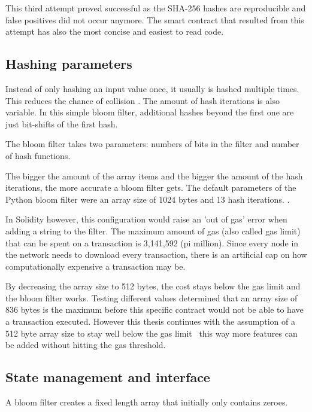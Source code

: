 This third attempt proved successful as the SHA-256 hashes are reproducible and false positives did not occur anymore. The smart contract that resulted from this attempt has also the most concise and easiest to read code.

\subsection{Hashing parameters}

Instead of only hashing an input value once, it usually is hashed multiple times. This reduces the chance of collision \cite{MultipleHashes}. The amount of hash iterations is also variable. In this simple bloom filter, additional hashes beyond the first one are just bit-shifts of the first hash.

The bloom filter takes two parameters: numbers of bits in the filter and number of hash functions. 

The bigger the amount of the array items and the bigger the amount of the hash iterations, the more accurate a bloom filter gets. The default parameters of the Python bloom filter were an array size of 1024 bytes and 13 hash iterations. \cite{SimpleBloomFilter}.

In Solidity however, this configuration would raise an 'out of gas' error when adding a string to the filter. 
The maximum amount of gas (also called gas limit) that can be spent on a transaction is 3,141,592 (pi million). Since every node in the network needs to download every transaction, there is an artificial cap on how computationally expensive a transaction may be.

By decreasing the array size to 512 bytes, the cost stays below the gas limit and the bloom filter works. 
Testing different values determined that an array size of 836 bytes is the maximum before this specific contract would not be able to have a transaction executed. However this thesis continues with the assumption of a 512 byte array size to stay well below the gas limit \textemdash \ this way more features can be added without hitting the gas threshold.

\subsection{State management and interface}

A bloom filter creates a fixed length array that initially only contains zeroes.


